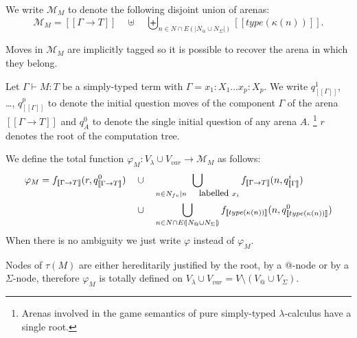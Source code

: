 \documentclass{llncs}
\newcommand{\lsem}{[\![} %
\newcommand{\rsem}{]\!]} %
\newcommand{\sem}[1]{{\lsem #1 \rsem}}
\newcommand\inter{\cap}
\newcommand\union{\cup}
\newcommand\Union{\bigcup}
\newcommand{\relimg}[1]{{(\!| #1 |\!)}}
\begin{document}
We write $\mathcal{M}_M$ to denote the following disjoint union of arenas:
$$\mathcal{M}_M = \sem{\Gamma \rightarrow T} \quad \uplus \quad  \biguplus_{n \in N \inter E \relimg{N_@ \union N_\Sigma} } \sem{type(\kappa(n))}.$$

Moves in $\mathcal{M}_M$ are implicitly tagged so it is possible to recover the arena in which they belong.


\begin{definition}
Let $\Gamma \vdash M : T$ be a simply-typed term
with $\Gamma = x_1:X_1 \ldots x_p : X_p$.
We write $q_{\sem{\Gamma}}^1$, \ldots, $q_{\sem{\Gamma}}^p$ to denote the initial question moves of the
component $\Gamma$ of the arena $\sem{\Gamma \rightarrow T}$ and $q^0_A$ to denote the single initial question of any arena $A$.
\footnote{Arenas involved in the game semantics of pure simply-typed $\lambda$-calculus have a single root.}
$r$ denotes the root of the computation tree.

We define the total function $\varphi_M : V_\lambda \union V_{var} \rightarrow \mathcal{M}_M$ as follows:
\begin{align*}
\varphi_M =
        f_{\sem{\Gamma \rightarrow T}}(r, q^0_{\sem{\Gamma \rightarrow T}}) \quad
    & \union \quad
    \Union_{n \in N_{fv} | n \mbox{ {\small labelled} } x_i }  f_{\sem{\Gamma \rightarrow T}}(n, q^i_{\sem{\Gamma}} ) \\
    & \union \quad
        \Union_{n \in N \inter E \relimg{N_@ \union N_\Sigma}}  f_{\sem{type(\kappa(n))}}(n, q^0_{\sem{type(\kappa(n))}} )
\end{align*}
When there is no ambiguity we just write $\varphi$ instead of $\varphi_M$.
\end{definition}

Nodes of $\tau(M)$ are either hereditarily justified by the root, by
a @-node or by a $\Sigma$-node, therefore $\varphi_M$ is totally
defined on $V_\lambda \union V_{var} = V\setminus (V_@ \union
V_\Sigma)$.
\end{document}
